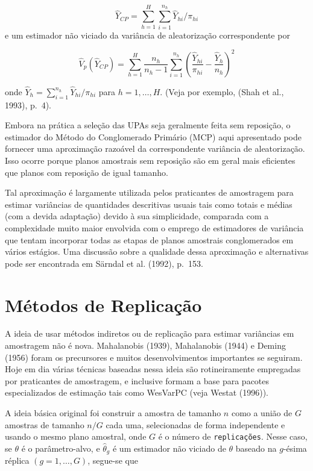 \documentclass[
  12pt,
  brazilian,
]{book}
\theoremstyle{definition}
\theoremstyle{definition}
\theoremstyle{definition}
\theoremstyle{definition}
\theoremstyle{remark}
\begin{document}
\[
\widehat{Y}_{CP}=\sum_{h=1}^{H}\sum_{i=1}^{n_{h}}\widehat{Y}_{hi}/\pi _{hi} 
\]
e um estimador não viciado da variância de aleatorização correspondente por

\[
\widehat{V}_{p}\left( \widehat{Y}_{CP}\right) =\sum_{h=1}^{H}\frac{n_{h}}
{n_{h}-1}\sum_{i=1}^{n_{h}}\left( \frac{\widehat{Y}_{hi}}{\pi _{hi}}-
\frac{\widehat{Y}_{h}}{n_{h}}\right) ^{2}  \label{eq:estpa22}
\]

onde \(\widehat{Y}_{h} = \sum_{i=1}^{n_{h}} \widehat{Y}_{hi} / \pi _{hi}\) para
\(h=1,\ldots ,H\). (Veja por exemplo, (Shah et al., 1993), p.~4).

Embora na prática a seleção das UPAs seja geralmente feita sem reposição, o estimador do Método do Conglomerado Primário (MCP) aqui apresentado pode fornecer uma aproximação razoável da correspondente variância de aleatorização. Isso ocorre porque planos amostrais sem reposição são em geral mais eficientes que planos com reposição de igual tamanho.

Tal aproximação é largamente utilizada pelos praticantes de amostragem para estimar variâncias de quantidades descritivas usuais tais como totais e médias (com a devida adaptação) devido à sua simplicidade, comparada com a complexidade muito maior envolvida com o emprego de estimadores de variância que tentam incorporar todas as etapas de planos amostrais conglomerados em vários estágios. Uma discussão sobre a qualidade dessa aproximação e alternativas pode ser encontrada em Särndal et al. (1992), p.~153.

\hypertarget{muxe9todos-de-replicauxe7uxe3o}{%
\section{Métodos de Replicação}\label{muxe9todos-de-replicauxe7uxe3o}}

A ideia de usar métodos indiretos ou de replicação para estimar variâncias em amostragem não é nova. Mahalanobis (1939), Mahalanobis (1944) e Deming (1956) foram os precursores e muitos desenvolvimentos importantes se seguiram. Hoje em dia várias técnicas baseadas nessa ideia são rotineiramente empregadas por praticantes de amostragem, e
inclusive formam a base para pacotes especializados de estimação tais como WesVarPC (veja Westat (1996)).

A ideia básica original foi construir a amostra de tamanho \(n\) como a união de \(G\) amostras de tamanho \(n/G\) cada uma, selecionadas de forma independente e usando o mesmo plano amostral, onde \(G\) é o número de \texttt{replicações}. Nesse caso, se \(\theta\) é o parâmetro-alvo, e \(\widehat{\theta}_{g}\) é um estimador não viciado de \(\theta\) baseado na \(g\)-ésima réplica \((g=1,\ldots ,G)\), segue-se que
\end{document}
